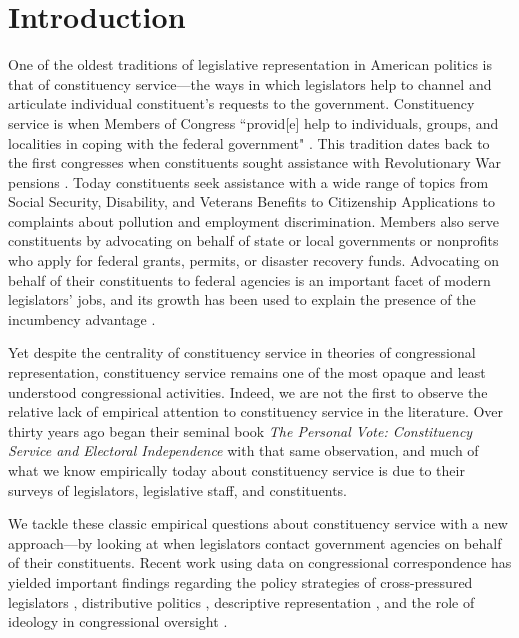\documentclass{article}
\begin{document}
%

\newpage
\doublespacing
\section{Introduction}

One of the oldest traditions of legislative representation in American politics is that of constituency service---the ways in which legislators help to channel and articulate individual constituent's requests to the government.  Constituency service is when Members of Congress ``provid[e] help to individuals, groups, and localities in coping with the federal government" \citep{Fenno1978}. This tradition dates back to the first congresses when constituents sought assistance with Revolutionary War pensions \citep{Eckman2017}. Today constituents seek assistance with a wide range of topics from Social Security, Disability, and Veterans Benefits to Citizenship Applications to complaints about pollution and employment discrimination. Members also serve constituents by advocating on behalf of state or local governments or nonprofits who apply for federal grants, permits, or disaster recovery funds. %
Advocating on behalf of their constituents to federal agencies is an important facet of modern legislators' jobs, and its growth has been used to explain the presence of the incumbency advantage \citep{King1991}.  

Yet despite the centrality of constituency service in theories of congressional representation, constituency service remains one of the most opaque and least understood congressional activities. Indeed, we are not the first to observe the relative lack of empirical attention to constituency service in the literature.  Over thirty years ago \citet*{CainFerejohnFiorina1987} began their seminal book \emph{The Personal Vote: Constituency Service and Electoral Independence} with that same observation, and much of what we know empirically today about constituency service is due to their surveys of legislators, legislative staff, and constituents.  

We tackle these classic empirical questions about constituency service with a new approach---by looking at when legislators contact government agencies on behalf of their constituents.  Recent work using data on congressional correspondence has yielded important findings regarding the policy strategies of cross-pressured legislators \citep{Ritchie2017}, distributive politics \citep{MillsKalafHuges2015}, descriptive representation \citep{LowandeRitchieLauterbach2018}, and the role of ideology in congressional oversight \citep{Lowande2018JOP}.  
\end{document}
